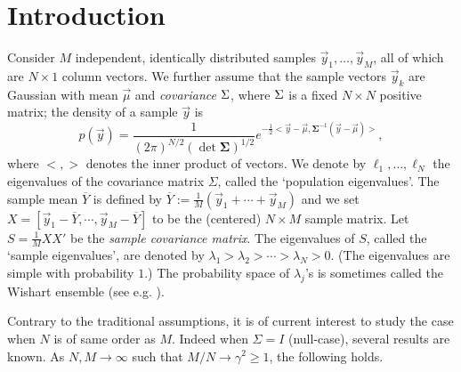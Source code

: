 \documentclass[11pt]{article}
\begin{document}
\begin{abstract}
We compute the limiting distributions of the largest eigenvalue of
a complex Gaussian sample covariance matrix when both the number
of samples and the number of variables in each sample become
large. When all but finitely many, say $r$, eigenvalues of the
covariance matrix are the same, the dependence of the limiting
distribution of the largest eigenvalue of the sample covariance
matrix on those distinguished $r$ eigenvalues of the covariance
matrix is completely characterized in terms of an infinite
sequence of new distribution functions that generalize the
Tracy-Widom distributions of the random matrix theory. Especially
a phase transition phenomena is observed. Our results also apply
to a last passage percolation model and a queuing model.
\end{abstract}

\section{Introduction}

Consider $M$  independent, identically distributed samples
$\vec{y}_1,\dots, \vec{y}_M$, all of which are $N\times 1$ column
vectors. We further assume that the sample vectors $\vec{y}_k$ are
Gaussian with mean $\vec{\mu}$ and \emph{covariance} $\Sigma$, where
$\Sigma$ is a fixed $N\times N$ positive matrix; the density of a
sample $\vec{y}$ is
\begin{equation}\label{eq:sampledensity}
  p(\vec{y})= \frac{1}{(2\pi)^{N/2} (\det \mathbf{\Sigma})^{1/2}}
e^{-\frac12 <\vec{y}-\vec{\mu},
\mathbf{\Sigma}^{-1}(\vec{y}-\vec{\mu})>} ,
\end{equation}
where $<,>$ denotes the inner product of vectors. We denote by
$\ell_1,\dots, \ell_N$ the eigenvalues of the covariance matrix
$\Sigma$, called the `population eigenvalues'. The sample mean
$\overline{Y}$ is defined by
$\overline{Y}:=\frac1{M}(\vec{y}_1+\cdots+\vec{y}_M)$ and we set
$X=[\vec{y}_1-\overline{Y},\cdots, \vec{y}_M-\overline{Y}]$ to be
the (centered) $N\times M$ sample matrix. Let $S=\frac1{M} XX'$ be
the \emph{sample covariance matrix}. The eigenvalues of $S$,
called the `sample eigenvalues', are denoted by $\lambda_1
>\lambda_2
> \cdots
>\lambda_N>0$. (The eigenvalues are simple with probability $1$.)
The probability space of $\lambda_j$'s is sometimes called the
Wishart ensemble (see e.g. \cite{Muirhead}).



Contrary to the traditional assumptions, it is of current interest
to study the case when $N$ is of same order as $M$. Indeed when
$\Sigma=I$ (null-case), several results are known. As
$N,M\to\infty$ such that $M/N\to \gamma^2 \ge 1$, the following
holds.
\end{document}
